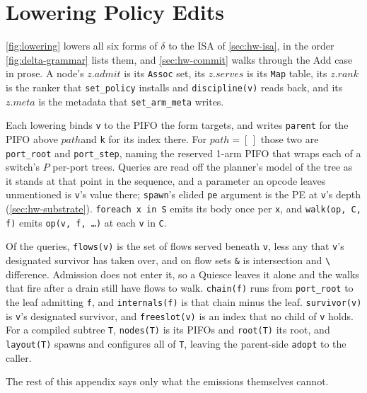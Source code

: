 \documentclass[sigplan,anonymous,review,nonacm]{acmart}
\newcommand{\notation}[1]{\ensuremath{#1}\ifmmode\else\xspace\fi}
\newcommand{\pth}{\notation{\mathit{path}}}
\newcommand{\Add}{\textsf{Add}}
\newcommand{\Quiesce}{\textsf{Quiesce}}
\begin{document}
\section{Lowering Policy Edits}\label{app:lowering}

\cref{fig:lowering} lowers all six forms of \(\delta\) to the ISA of \cref{sec:hw-isa}, in the order \cref{fig:delta-grammar} lists them, and \cref{sec:hw-commit} walks through the \Add{} case in prose.
A node's \(\mathit{z}.\mathit{admit}\) is its \texttt{Assoc} set, its \(\mathit{z}.\mathit{serves}\) is its \texttt{Map} table, its \(\mathit{z}.\mathit{rank}\) is the ranker that \texttt{set\_policy} installs and \texttt{discipline(v)} reads back, and its \(\mathit{z}.\mathit{meta}\) is the metadata that \texttt{set\_arm\_meta} writes.

Each lowering binds \texttt{v} to the PIFO the form targets, and writes \texttt{parent} for the PIFO above \pth and \texttt{k} for its index there.
For \(\mathit{path} = [\,]\) those two are \texttt{port\_root} and \texttt{port\_step}, naming the reserved 1-arm PIFO that wraps each of a switch's \(P\) per-port trees.
Queries are read off the planner's model of the tree as it stands at that point in the sequence, and a parameter an opcode leaves unmentioned is \texttt{v}'s value there; \texttt{spawn}'s elided \texttt{pe} argument is the PE at \texttt{v}'s depth (\cref{sec:hw-substrate}).
\texttt{foreach x in S} emits its body once per \texttt{x}, and \texttt{walk(op, C, f)} emits \texttt{op(v, f, \ldots)} at each \texttt{v} in \texttt{C}.

Of the queries, \texttt{flows(v)} is the set of flows served beneath \texttt{v}, less any that \texttt{v}'s designated survivor has taken over, and on flow sets \texttt{\&} is intersection and \texttt{\textbackslash} difference.
Admission does not enter it, so a \Quiesce{} leaves it alone and the walks that fire after a drain still have flows to walk.
\texttt{chain(f)} runs from \texttt{port\_root} to the leaf admitting \texttt{f}, and \texttt{internals(f)} is that chain minus the leaf.
\texttt{survivor(v)} is \texttt{v}'s designated survivor, and \texttt{freeslot(v)} is an index that no child of \texttt{v} holds.
For a compiled subtree \texttt{T}, \texttt{nodes(T)} is its PIFOs and \texttt{root(T)} its root, and \texttt{layout(T)} spawns and configures all of \texttt{T}, leaving the parent-side \texttt{adopt} to the caller.

The rest of this appendix says only what the emissions themselves cannot.
\end{document}
